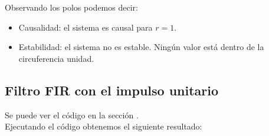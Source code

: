 \documentclass[11pt,a4paper]{article}
\begin{document}
Observando los polos podemos decir:

\begin{itemize}
	\item Causalidad: el sistema es causal para $r=1$.
	\item Estabilidad: el sistema no es estable. Ningún valor está dentro de la circuferencia unidad.
\end{itemize}

\subsection{Filtro FIR con el impulso unitario}

Se puede ver el código en la sección \color{deepred}\color{black}.\\

Ejecutando el código obtenemos el siguiente resultado:
\end{document}
